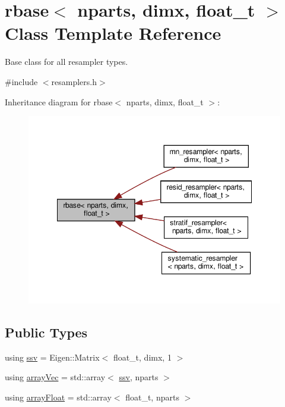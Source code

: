 \hypertarget{classrbase}{}\section{rbase$<$ nparts, dimx, float\+\_\+t $>$ Class Template Reference}
\label{classrbase}


Base class for all resampler types.  




{\ttfamily \#include $<$resamplers.\+h$>$}



Inheritance diagram for rbase$<$ nparts, dimx, float\+\_\+t $>$\+:\nopagebreak
\begin{figure}[H]
\begin{center}
\leavevmode
\includegraphics[width=348pt]{classrbase__inherit__graph}
\end{center}
\end{figure}
\subsection*{Public Types}
\begin{DoxyCompactItemize}
\item 
using \hyperlink{classrbase_ae20e0b8df15aa109252f57ecbf1f20f8}{ssv} = Eigen\+::\+Matrix$<$ float\+\_\+t, dimx, 1 $>$
\item 
using \hyperlink{classrbase_aa12fc826befa6ba0647b5f59ebc396ee}{array\+Vec} = std\+::array$<$ \hyperlink{classrbase_ae20e0b8df15aa109252f57ecbf1f20f8}{ssv}, nparts $>$
\item 
using \hyperlink{classrbase_a6f76bef853e508cb5b6f546d231b06f5}{array\+Float} = std\+::array$<$ float\+\_\+t, nparts $>$
\end{DoxyCompactItemize}
